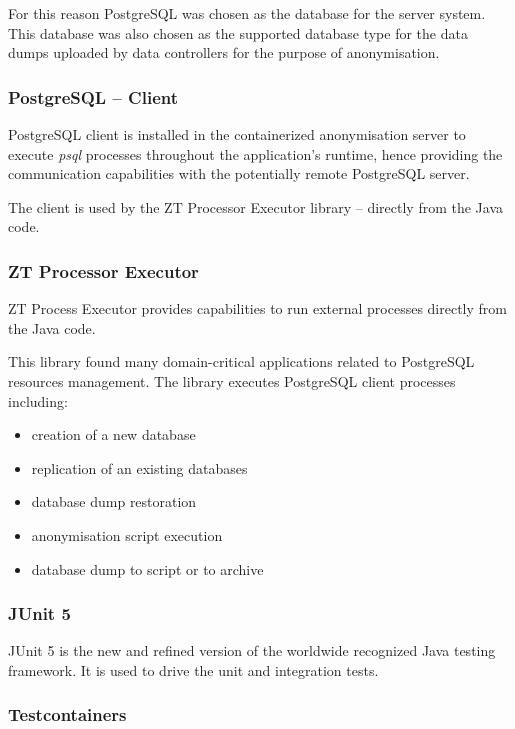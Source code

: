 \documentclass[a4paper,twoside,12pt]{book}
\begin{document}
For this reason PostgreSQL was chosen as the database for the server system. This database was also chosen as the supported database type for the data dumps uploaded by data controllers for the purpose of anonymisation.


\subsubsection{PostgreSQL – Client}

PostgreSQL client is installed in the containerized anonymisation server to execute \textit{psql} processes throughout the application's runtime, hence providing the communication capabilities with the potentially remote PostgreSQL server.

The client is used by the ZT Processor Executor library – directly from the Java code.

\subsubsection{ZT Processor Executor}

ZT Process Executor provides capabilities to run external processes directly from the Java code.

This library found many domain-critical applications related to PostgreSQL resources management. The library executes PostgreSQL client processes including:
\begin{itemize}
\item creation of a new database
\item replication of an existing databases
\item database dump restoration
\item anonymisation script execution
\item database dump to script or to archive
\end{itemize}

\subsubsection{JUnit 5}

JUnit 5 is the new and refined version of the worldwide recognized Java testing framework. It is used to drive the unit and integration tests.


\subsubsection{Testcontainers}
\end{document}

